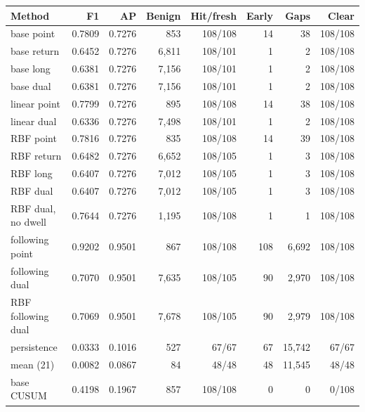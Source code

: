 \begin{tabular}{lrrrrrrr}\toprule
Method & F1 & AP & Benign & Hit/fresh & Early & Gaps & Clear \\\midrule
base point & 0.7809 & 0.7276 & 853 & 108/108 & 14 & 38 & 108/108 \\
base return & 0.6452 & 0.7276 & 6,811 & 108/101 & 1 & 2 & 108/108 \\
base long & 0.6381 & 0.7276 & 7,156 & 108/101 & 1 & 2 & 108/108 \\
base dual & 0.6381 & 0.7276 & 7,156 & 108/101 & 1 & 2 & 108/108 \\
linear point & 0.7799 & 0.7276 & 895 & 108/108 & 14 & 38 & 108/108 \\
linear dual & 0.6336 & 0.7276 & 7,498 & 108/101 & 1 & 2 & 108/108 \\
RBF point & 0.7816 & 0.7276 & 835 & 108/108 & 14 & 39 & 108/108 \\
RBF return & 0.6482 & 0.7276 & 6,652 & 108/105 & 1 & 3 & 108/108 \\
RBF long & 0.6407 & 0.7276 & 7,012 & 108/105 & 1 & 3 & 108/108 \\
RBF dual & 0.6407 & 0.7276 & 7,012 & 108/105 & 1 & 3 & 108/108 \\
RBF dual, no dwell & 0.7644 & 0.7276 & 1,195 & 108/108 & 1 & 1 & 108/108 \\
following point & 0.9202 & 0.9501 & 867 & 108/108 & 108 & 6,692 & 108/108 \\
following dual & 0.7070 & 0.9501 & 7,635 & 108/105 & 90 & 2,970 & 108/108 \\
RBF following dual & 0.7069 & 0.9501 & 7,678 & 108/105 & 90 & 2,979 & 108/108 \\
persistence & 0.0333 & 0.1016 & 527 & 67/67 & 67 & 15,742 & 67/67 \\
mean (21) & 0.0082 & 0.0867 & 84 & 48/48 & 48 & 11,545 & 48/48 \\
base CUSUM & 0.4198 & 0.1967 & 857 & 108/108 & 0 & 0 & 0/108 \\
\bottomrule\end{tabular}
